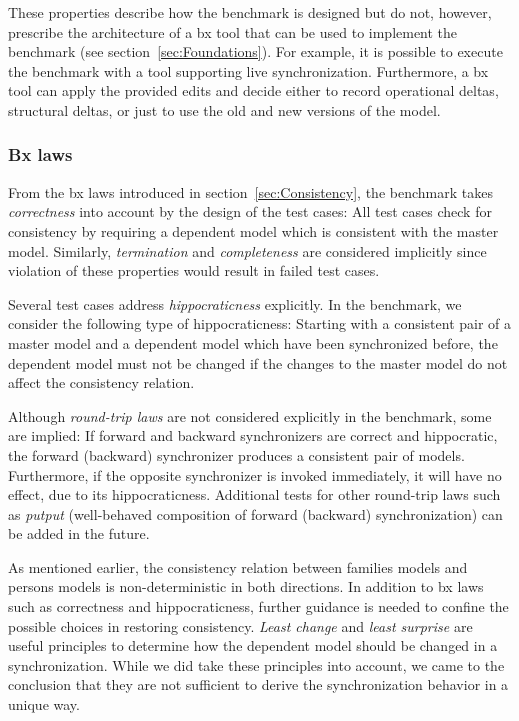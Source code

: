 %	
%
These properties describe how the benchmark is designed but do not, however, prescribe the architecture of a bx tool that can be used to implement the benchmark (see section~\ref{sec:Foundations}).
For example, it is possible to execute the benchmark with a tool supporting live synchronization. Furthermore, a bx tool can apply the provided edits and decide either to record operational deltas, structural deltas, or just to use the old and new versions of the model.

\subsubsection{Bx laws}
\label{sec:BxLaws}

From the bx  laws introduced in section~\ref{sec:Consistency}, the benchmark takes \emph{correctness} into account by the design of the test cases: All test cases check for consistency by requiring a dependent model which is consistent with the master model. Similarly, \emph{termination} and \emph{completeness} are considered implicitly since violation of these properties would result in failed test cases.

Several test cases address \emph{hippocraticness} explicitly. In the benchmark, we consider the following type of hippocraticness: Starting with a consistent pair of a master model and a dependent model which have been synchronized before, the dependent model must not be changed if the changes to the master model do not affect the consistency relation. 

Although \emph{round-trip laws} are not considered explicitly in the benchmark, some are implied: If forward and backward synchronizers are correct and hippocratic, the forward (backward) synchronizer produces a consistent pair of models.
Furthermore, if the opposite synchronizer is invoked immediately, it will have no effect, due to its hippocraticness.
Additional tests for other round-trip laws such as \emph{putput} (well-behaved composition of forward (backward) synchronization) can be added in the future.

As mentioned earlier, the consistency relation between families models and persons models is non-de\-ter\-min\-istic in both directions.
In addition to bx laws such as correctness and hippocraticness, further guidance is needed to confine the possible choices in restoring consistency.
\emph{Least change} and \emph{least surprise} are useful principles to determine how the dependent model should be changed in a synchronization.
While we did take these principles into account, we came to the conclusion that they are not sufficient to derive the synchronization behavior in a unique way. 

